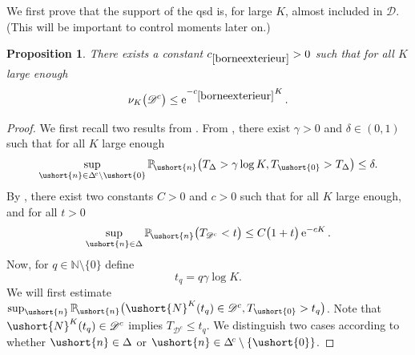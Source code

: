 \documentclass[11pt]{article}
\let\backslash\setminus
\let\mathcal\mathscr
\numberwithin{equation}{section}
\theoremstyle{plain}
\newtheorem{proposition}[theorem]{Proposition}
\theoremstyle{definition}
\newcommand{\pcte}[1]{c_{\eqref{#1}}}
\newcommand{\proba}{{\mathbb{P}}}
\newcommand{\integers}{\mathbb{N}}
\newcommand{\vecn}{\ushort{n}}
\newcommand{\veczer}{\ushort{0}}
\newcommand{\sDelta}{\Delta}
\newcommand{\leproc}{\ushort{N}^{K}}
\newcommand{\nuk}{\nu_{K}}\let\snuk\nuk
\newcommand{\e}{\operatorname{e}}
\begin{document}
We first prove that the support of the qsd is, for large $K$, almost included in $ \mathcal{D}$. (This will be important to control moments later on.)
\begin{proposition}\label{borneexterieur}
There exists a constant $\pcte{borneexterieur}>0$ such that for all $K$ large enough
\[
\nuk\bigl(\mathcal{D}^{c}\bigr)\le \e^{-\pcte{borneexterieur}K}.
\]
\end{proposition}
\begin{proof}
We first recall two results from \cite{ccm2}.
From \cite[Lem.\,1.5]{ccm2}, there exist $\gamma>0$ and $\delta\in(0,1)$ such that for all $K$ large enough
\begin{equation}\label{res1}
\sup_{\vecn\in\sDelta^{\!c}\backslash\veczer}\proba_{\!\vecn}\bigl(T_{\sDelta}>\gamma\log K,T_{\veczer}>T_{\sDelta}\bigr)\leq \delta.
\end{equation}
By \cite[Sublem.\,5.8]{ccm2}, there exist two constants $C>0$ and $c>0$ such that for all $K$ large enough, and for all $t>0$
\begin{equation}\label{res2}
\sup_{\vecn\in\Delta}\proba_{\!\vecn}\bigl(T_{ \mathcal{D}^{c}}<t\bigr)\leq C\bigl(1+t\bigr) \e^{-c K}.
\end{equation}
Now, for $q\in\integers\backslash \{0\}$ define
\[
t_{q}=q\gamma\log K.
\]
We will first estimate
$\sup_{\vecn}\proba_{\!\vecn}\bigl(\leproc(t_{q})\in \mathcal{D}^{c}, T_{\veczer}>t_q\bigr)$.
Note that $\leproc(t_{q})\in \mathcal{D}^{c}$ implies $T_{ \mathcal{D}^{c}}\leq t_{q}$.
We distinguish two cases according to whether $\vecn\in \Delta$ or $\vecn\in \Delta^{\!c}\backslash\{\veczer\}$.


\end{proof}
\end{document}
